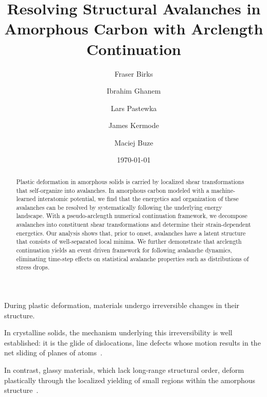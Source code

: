 \documentclass[aps,prl,reprint,superscriptaddress]{revtex4-2}
\begin{document}
\title{Resolving Structural Avalanches in Amorphous Carbon with Arclength Continuation}

\author{Fraser Birks}

\author{Ibrahim Ghanem}
\author{Lars Pastewka}

\author{James Kermode}

\author{Maciej Buze}

\date{\today}
\begin{abstract}
Plastic deformation in amorphous solids is carried by localized shear transformations that self-organize into avalanches. In amorphous carbon modeled with a machine-learned interatomic potential, we find that the energetics and organization of these avalanches can be resolved by systematically following the underlying energy landscape. With a pseudo-arclength numerical continuation framework, we decompose avalanches into constituent shear transformations and determine their strain-dependent energetics. Our analysis shows that, prior to onset, avalanches have a latent structure that consists of well-separated local minima. We further demonstrate that arclength continuation yields an event driven framework for following avalanche dynamics, eliminating time-step effects on statistical avalanche properties such as distributions of stress drops.
\end{abstract}

\maketitle

During plastic deformation, materials undergo irreversible changes in their structure.

In crystalline solids, the mechanism underlying this irreversibility is well established: it is the glide of dislocations, line defects whose motion results in the net sliding of planes of atoms~\cite{hirth_theory_1983}.

In contrast, glassy materials, which lack long-range structural order, deform plastically through the localized yielding of small regions within the amorphous structure~\cite{argon_plastic_1979,spaepen_microscopic_1977}.
\end{document}
